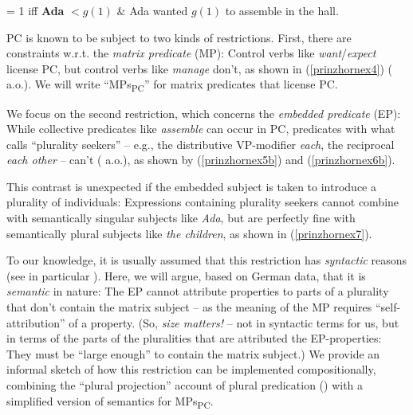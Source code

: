 \documentclass[output=paper]{langscibook}
\begin{document}
\ea	\label{prinzhornex3}  = 1 iff \textbf{Ada} $< g(1)$ $\&$ Ada wanted $g(1)$ to assemble in the hall. \z

PC is known to be subject to two kinds of restrictions. First, there are constraints w.r.t. the \textit{matrix predicate} (MP): Control verbs like \textit{want}/\textit{expect} license PC, but control verbs like \textit{manage} don't, as shown in (\ref{prinzhornex4}) (\citealt{Landau:2000, Pearson:2016} a.o.). We will write “MPs\textsubscript{PC}” for matrix predicates that license PC.

\z
	
We focus on the second restriction, which concerns the \textit{embedded predicate} (EP): While collective predicates like  \textit{assemble} can occur in PC, predicates with what \citet{Schwarzschild:1996} calls “plurality seekers” -- e.g., the distributive VP-mod\-i\-fi\-er \textit{each}, the reciprocal  \textit{each other} -- can't (\citealt{Landau:2000} a.o.), as shown by (\ref{prinzhornex5b}) and (\ref{prinzhornex6b}).

\ea\label{prinzhornex5}
\z\z

This contrast is unexpected if the embedded subject is taken to introduce a plurality of individuals: Expressions containing plurality seekers cannot combine with semantically singular subjects like \textit{Ada}, but are perfectly fine with semantically plural subjects like \textit{the children}, as shown in (\ref{prinzhornex7}).

\ea \label{prinzhornex7}
\z\z

To our knowledge, it is usually assumed that this restriction has \textit{syntactic} reasons (see in particular \citealt{Landau:2000}). Here, we will argue, based on German data, that it is \textit{semantic} in nature: The EP cannot attribute properties to parts of a plurality that don't contain the matrix subject --  as the meaning of the MP requires “self-attribution” of a property. (So, \textit{size matters!} -- not in syntactic terms for us, but in terms of the parts of the pluralities that are attributed the EP-properties: They must be “large enough” to contain the matrix subject.) We provide an informal sketch of how this restriction can be implemented compositionally, combining  the “plural projection” account of plural predication (\citealt{Schmitt:2019, Haslinger:2018a, Haslinger:2018b}) with a simplified version of \citet{Pearson:2016} semantics for MPs\textsubscript{PC}.
\end{document}
